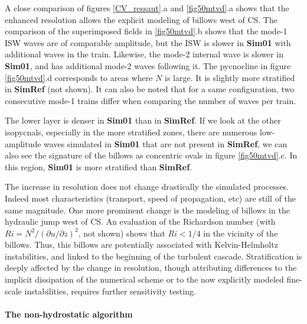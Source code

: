 
A close comparison of figures \ref{CV_ressaut}.a and \ref{fig50mtvd}.a shows that the enhanced resolution allows the explicit modeling of billows west of CS. The comparison of the superimposed fields in \ref{fig50mtvd}.b shows that the mode-1 ISW waves are of comparable amplitude, but the ISW is slower in \textbf{Sim01} with additional waves in the train. Likewise, the mode-2 internal wave is slower in \textbf{Sim01}, and has additional mode-2 waves following it. The pycnocline in figure \ref{fig50mtvd}.d %
corresponds to areas where $N$ is large. It is slightly more stratified in \textbf{SimRef} (not shown). It can also be noted that for a same configuration, two consecutive mode-1 trains differ when comparing the number of waves per train.

The lower layer is denser in \textbf{Sim01} than in \textbf{SimRef}. If we look at the other isopycnals, especially in the more stratified zones, there are numerous low-amplitude waves simulated in \textbf{Sim01} that are not present in \textbf{SimRef}, we can also see the signature of the billows as concentric ovals in figure \ref{fig50mtvd}.c. In this region, \textbf{Sim01} is more stratified than \textbf{SimRef}.

The increase in resolution does not change drastically the simulated processes. Indeed most characteristics (transport, speed of propagation, etc) are still of the same magnitude. One more prominent change is the modeling of billows in the hydraulic jump west of CS. An evaluation of the Richardson number (with $Ri =  N^2 / \left({\partial u}/{\partial z}\right)^2$, not shown) shows that $Ri < 1/4$ in the vicinity of the billows. Thus, this billows are potentially associated with Kelvin-Helmholtz instabilities, and linked to the beginning of the turbulent cascade. 
Stratification is deeply affected by the change in resolution, though attributing differences to the implicit dissipation of the numerical scheme or to the now explicitly modeled fine-scale instabilities, requires further sensitivity testing.
 
\paragraph{The non-hydrostatic algorithm}

